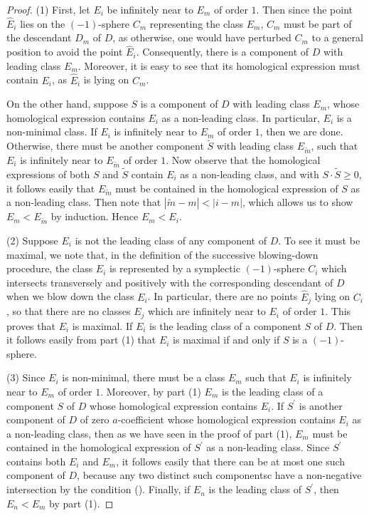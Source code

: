 \documentclass[11pt]{amsart}
\theoremstyle{plain}
\numberwithin{theorem}{section}
\theoremstyle{definition}
\begin{document}
\begin{proof}
(1) First, let $E_i$ be infinitely near to $E_m$ of order $1$. Then since the point $\hat{E}_i$ lies on
the $(-1)$-sphere $C_m$ representing the class $E_m$, $C_m$ must be part of the descendant $D_m$ of
$D$, as otherwise, one would have perturbed $C_m$ to a general position to avoid the point 
$\hat{E}_i$. Consequently, there is a component of $D$ with leading class $E_m$. Moreover, it is
easy to see that its homological expression must contain $E_i$, as $\hat{E}_i$ is lying on $C_m$.

On the other hand, suppose $S$ is a component of $D$ with leading class $E_m$, whose homological
expression contains $E_i$ as a non-leading class. In particular, $E_i$ is a non-minimal class. If $E_i$ is infinitely near to $E_m$ of order $1$, then we are done. Otherwise, there must be another component $\tilde{S}$ with leading class
$E_{\tilde{m}}$, such that $E_i$ is infinitely near to $E_{\tilde{m}}$ of order $1$. Now observe that the homological expressions of both $S$ and $\tilde{S}$ contain $E_i$ as a non-leading class, and with $S\cdot \tilde{S}\geq 0$, it follows easily that $E_{\tilde{m}}$ must be contained in the homological expression of $S$ as a non-leading class. Then note that $|\tilde{m}-m|<|i-m|$, which allows us to 
show $E_m<E_{\tilde{m}}$ by induction. Hence $E_m<E_i$. 

(2) Suppose $E_i$ is not the leading class of any component of $D$. To see it must be maximal,
we note that, in the definition of the successive blowing-down procedure, the class $E_i$ is represented by a symplectic $(-1)$-sphere $C_i$ which intersects transversely and positively with the corresponding descendant of $D$ when we blow down the class $E_i$. In particular, there are no points 
$\hat{E}_j$ lying on $C_i$, so that there are no classes $E_j$ which are infinitely near to $E_i$ of order $1$. This proves that $E_i$ is maximal. If $E_i$ is the leading class of a component $S$ of $D$. Then it follows easily from part (1) that $E_i$ is maximal if and only if $S$ is a $(-1)$-sphere. 

(3) Since $E_i$ is non-minimal, there must be a class $E_m$ such that $E_i$ is infinitely near to
$E_m$ of order $1$. Moreover, by part (1) $E_m$ is the leading class of a component $S$ of $D$ whose
homological expression contains $E_i$. If $S^\prime$ is another component of $D$ of zero 
$a$-coefficient whose homological expression contains $E_i$ as a non-leading class, then 
as we have seen in the proof of part (1), $E_m$ must be contained in the homological expression of 
$S^\prime$ as a non-leading class. Since $S^\prime$ contains both $E_i$ and $E_m$, it follows easily
that there can be at most one such component of $D$, because any two distinct such componentsc have a non-negative intersection by the condition (\dag). Finally, if $E_n$ is the leading class of $S^\prime$, then $E_n<E_m$ by part (1). 


\end{proof}
\end{document}
